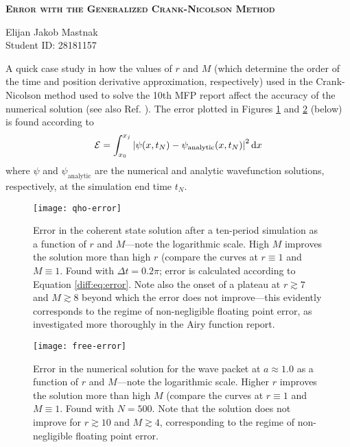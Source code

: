 \documentclass[11pt, a4paper]{article}
\newcommand{\diff}{\mathop{}\!\mathrm{d}} %
\begin{document}

\begin{center}
{\scshape \Large \textbf{Error with the Generalized Crank-Nicolson Method}\par}
\vspace{2mm}
{Elijan Jakob Mastnak\\[1mm]\small{Student ID: 28181157}}
\end{center}
\vspace{10mm}

A quick case study in how the values of $ r $ and $ M $ (which determine the order of the time and position derivative approximation, respectively) used in the Crank-Nicolson method used to solve the 10th MFP report affect the accuracy of the numerical solution (see also Ref. \cite{vandijk}). The error plotted in Figures \ref{diff:fig:qho-error} and \ref{diff:fig:free-error} (below) is found according to
\begin{equation}
	\mathcal{E} = \int_{x_{0}}^{x_{j}} \abs{\psi(x, t_{N}) - \psi_{\text{analytic}}(x, t_{N})}^{2} \diff x \label{diff:eq:error}
\end{equation}
where $ \psi $ and $ \psi_{\text{analytic}} $ are the numerical and analytic wavefunction solutions, respectively, at the simulation end time $ t_{N} $. 


\begin{figure}[htb!]
\centering
\texttt{[image: qho-error]}
\caption{Error in the coherent state solution after a ten-period simulation as a function of $ r $ and $ M $---note the logarithmic scale. High $ M $ improves the solution more than high $ r $ (compare the curves at $ r \equiv 1$ and $ M \equiv 1 $. Found with $ \Delta t = 0.2\pi $; error is calculated according to Equation \ref{diff:eq:error}. Note also the onset of a plateau at $ r \gtrsim 7 $ and $ M \gtrsim 8 $ beyond which the error does not improve---this evidently corresponds to the regime of non-negligible floating point error, as investigated more thoroughly in the Airy function report.}
\label{diff:fig:qho-error}
\end{figure}

\begin{figure}[htb!]
\centering
\texttt{[image: free-error]}
\caption{Error in the numerical solution for the wave packet at $ a \approx 1.0 $ as a function of $ r $ and $ M $---note the logarithmic scale. Higher $ r $ improves the solution more than high $ M $ (compare the curves at $ r \equiv 1$ and $ M \equiv 1 $. Found with $ N = 500 $. Note that the solution does not improve for $ r \gtrsim 10 $ and $ M \gtrsim 4 $, corresponding to the regime of non-negligible floating point error.}
\label{diff:fig:free-error}
\end{figure}
\end{document}
